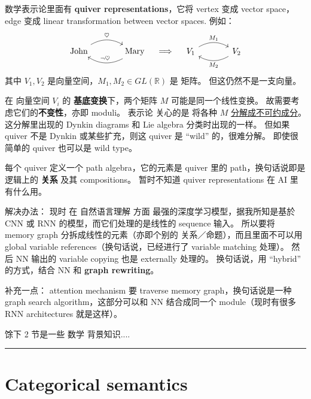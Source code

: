 \documentclass[12pt, orivec]{article}
\begin{document}
\begin{tcolorbox}[breakable, parbox=false]
数学表示论里面有 \textbf{quiver representations}，它将 vertex 变成 vector space，edge 变成 linear transformation between vector spaces. 例如：
\begin{equation}
\begin{tikzcd}[column sep = large]
\mbox{John} \arrow[r, bend left, "\heartsuit"] & \arrow[l, bend left, swap, "\neg \heartsuit"] \mbox{Mary}
\end{tikzcd}
\quad \Longrightarrow \quad
\begin{tikzcd}[column sep = large]
V_1 \arrow[r, bend left, "M_1"] & \arrow[l, bend left, "M_2"] V_2
\end{tikzcd}
\end{equation}
其中 $V_1, V_2$ 是向量空间，$M_1, M_2 \in GL(\mathbb{R})$ 是 矩阵。  但这仍然不是一支向量。  

在 向量空间 $V_i$ 的 \textbf{基底变换}下，两个矩阵 $M$ 可能是同一个线性变换。  故需要考虑它们的\textbf{不变性}，亦即 moduli。 表示论 关心的是 将各种 $M$ \uline{分解成不可约成分}。 这分解里出现的 Dynkin diagrams 和 Lie algebra 分类时出现的一样。  但如果 quiver 不是 Dynkin 或某些扩充，则这 quiver 是 ``wild'' 的，很难分解。 即使很简单的 quiver 也可以是 wild type。

每个 quiver 定义一个 path algebra，它的元素是 quiver 里的 path，换句话说即是逻辑上的 \textbf{关系} 及其 compositions。 暂时不知道 quiver representations 在 AI 里有什么用。
\end{tcolorbox}

解决办法： 现时 在 自然语言理解 方面 最强的深度学习模型，据我所知是基於 CNN 或 RNN 的模型，而它们处理的是线性的 sequence 输入。 所以要将 memory graph 分拆成线性的元素（亦即个别的 关系／命题），而且里面不可以用 global variable references（换句话说，已经进行了 variable matching 处理）。  然后 NN 输出的 variable copying 也是 externally 处理的。 换句话说，用 ``hybrid'' 的方式，结合 NN 和 \textbf{graph rewriting}。

补充一点： attention mechanism 要 traverse memory graph，换句话说是一种 graph search algorithm，这部分可以和 NN 结合成同一个 module（现时有很多 RNN architectures 就是这样）。

馀下 2 节是一些 数学 背景知识....
\hrule

\section{Categorical semantics}
\label{Categorical-semantics}
\end{document}
